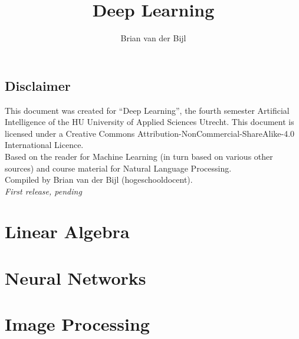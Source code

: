 \documentclass[a4paper,openany]{tufte-book-hu}
\title{Deep Learning}
\author{Brian van der Bijl}
\begin{document}
\maketitle

\chapter*{Disclaimer} 
\noindent This document was created for \enquote{Deep Learning}, the fourth semester Artificial Intelligence of the HU University of Applied Sciences Utrecht. This document is licensed under a Creative Commons Attribution-NonCommercial-ShareAlike-4.0 International Licence.\\

Based on the reader for Machine Learning (in turn based on various other sources) and course material for Natural Language Processing.\\[3mm] %

\noindent Compiled by Brian van der Bijl (hogeschooldocent).\\[5mm] %


\noindent \textit{First release, pending} %

\frontmatter

\tableofcontents

\mainmatter



\part{Linear Algebra}


\part{Neural Networks}




\part{Image Processing}



\end{document}
